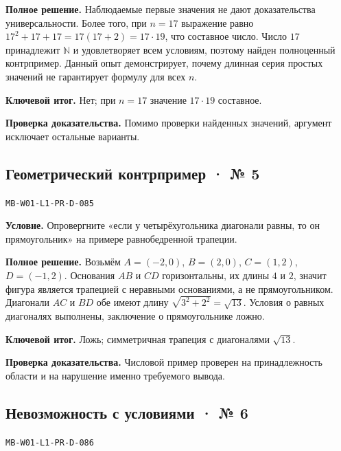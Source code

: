 \documentclass[11pt,a4paper,openany]{book}
\newcommand{\muid}[1]{\texttt{\footnotesize #1}}
\begin{document}
\textbf{Полное решение.} Наблюдаемые первые значения не дают доказательства универсальности. Более того, при $n=17$ выражение равно $17^2+17+17=17(17+2)=17\cdot19$, что составное число. Число $17$ принадлежит $\mathbb N$ и удовлетворяет всем условиям, поэтому найден полноценный контрпример. Данный опыт демонстрирует, почему длинная серия простых значений не гарантирует формулу для всех $n$.


\begin{learnbox}\textbf{Ключевой итог.} Нет; при $n=17$ значение $17\cdot19$ составное.\par \textbf{Проверка доказательства.} 
Помимо проверки найденных значений, аргумент исключает остальные варианты. 
\end{learnbox}

\subsection*{Геометрический контрпример · № 5}\hypertarget{solution:MB-W01-L1-PR-D-085}{}

\muid{MB-W01-L1-PR-D-085}\par

\textbf{Условие.} Опровергните «если у четырёхугольника диагонали равны, то он прямоугольник» на примере равнобедренной трапеции.\par

\textbf{Полное решение.} Возьмём $A=(-2,0)$, $B=(2,0)$, $C=(1,2)$, $D=(-1,2)$. Основания $AB$ и $CD$ горизонтальны, их длины $4$ и $2$, значит фигура является трапецией с неравными основаниями, а не прямоугольником. Диагонали $AC$ и $BD$ обе имеют длину $\sqrt{3^2+2^2}=\sqrt{13}$. Условия о равных диагоналях выполнены, заключение о прямоугольнике ложно.


\begin{learnbox}\textbf{Ключевой итог.} Ложь; симметричная трапеция с диагоналями $\sqrt{13}$.\par \textbf{Проверка доказательства.} 
Числовой пример проверен на принадлежность области и на нарушение именно требуемого вывода. 
\end{learnbox}

\subsection*{Невозможность с условиями · № 6}\hypertarget{solution:MB-W01-L1-PR-D-086}{}

\muid{MB-W01-L1-PR-D-086}\par
\end{document}
